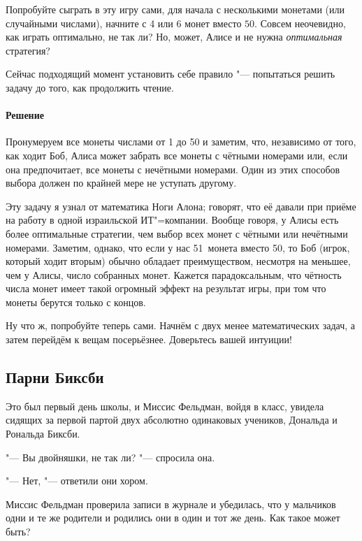\documentclass[twoside]{book}
\makeatletter
\newcommand{\rindex}[2][\imki@jobname]{%
  \index[#1]{\detokenize{#2}}%
}
\makeatother
\begin{document}
\medskip

Попробуйте сыграть в эту игру сами, для начала с несколькими монетами (или случайными числами), начните с 4 или 6 монет вместо $50$.
Совсем неочевидно, как играть оптимально, не так ли?
Но, может, Алисе и не нужна \emph{оптимальная} стратегия? 

Сейчас подходящий момент установить себе правило "--- попытаться решить задачу до того, как продолжить чтение.

\paragraph{Решение}
Пронумеруем все монеты числами от 1 до 50 и заметим, что, независимо от того, как ходит Боб, Алиса может забрать все монеты с чётными номерами или, если она предпочитает, все монеты с нечётными номерами.
Один из этих способов выбора должен по крайней мере не уступать другому.
\heart

Эту задачу я узнал от математика Ноги Алона;
говорят, что её давали при приёме на работу в одной израильской ИТ"=компании.
Вообще говоря, у Алисы есть более оптимальные стратегии, чем выбор всех монет с чётными или нечётными номерами.
Заметим, однако, что если у нас 51~монета вместо 50, то Боб (игрок, который ходит вторым) обычно обладает преимуществом, несмотря на меньшее, чем у Алисы, число собранных монет.
Кажется парадоксальным, что чётность числа монет имеет такой огромный эффект на результат игры, при том что монеты берутся только с концов.

\medskip

Ну что ж, попробуйте теперь сами.
Начнём с двух менее математических задач, а затем перейдём к вещам посерьёзнее.
Доверьтесь вашей интуиции!

\subsection*{Парни Биксби} %
\rindex{Парни Биксби}

Это был первый день школы, и Миссис Фельдман, войдя в класс, увидела сидящих за первой партой двух абсолютно одинаковых учеников, Дональда и Рональда Биксби.

"--- Вы двойняшки, не так ли? "--- спросила она.

"--- Нет, "--- ответили они хором.

Миссис Фельдман проверила записи в журнале и убедилась, что у мальчиков одни и те же родители и родились они в один и тот же день.
Как такое может быть?
\end{document}
